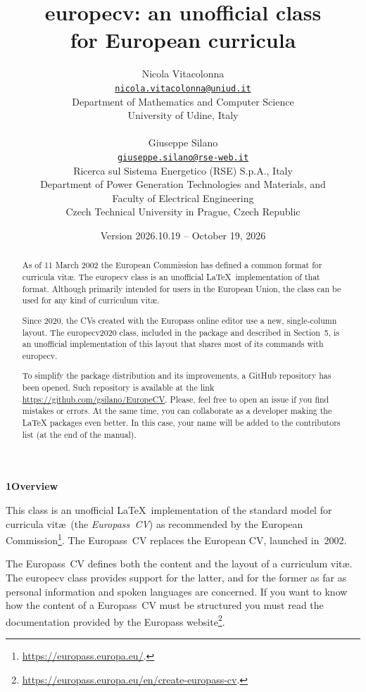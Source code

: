 \documentclass{europecv}
\title{\textsf{europecv}: an unofficial class\\
	for European curricula}
\author{Nicola Vitacolonna\\
	\href{mailto:nicola.vitacolonna@uniud.it}{\texttt{nicola.vitacolonna@uniud.it}}\\
	Department of Mathematics and Computer Science\\
	University of Udine, Italy\\
	\\
	Giuseppe Silano\\
	\href{mailto:giuseppe.silano@rse-web.it}{\texttt{giuseppe.silano@rse-web.it}}\\
    Ricerca sul Sistema Energetico (RSE) S.p.A., Italy\\ 
    Department of Power Generation Technologies and Materials, and\\
    Faculty of Electrical Engineering\\
    Czech Technical University in Prague, Czech Republic\\
}
\date{Version 2026.10.19 -- October 19, 2026}
\begin{document}

\maketitle

\pagestyle{plain}


\label{ABSTRACT}
\begin{abstract}

As of 11 March 2002 the European Commission has defined a common format for curricula vit\ae. The \textsf{europecv} class is an unofficial \LaTeX\ implementation of that format. Although primarily intended for users in the European Union, the class can be used for any kind of curriculum vit\ae.

Since 2020, the CVs created with the Europass online editor use a new, single-column layout. The \textsf{europecv2020} class, included in the package and described in Section~5, is an unofficial implementation of this layout that shares most of its commands with \textsf{europecv}.

To simplify the package distribution and its improvements, a GitHub repository has been opened.
Such repository is available at the link \url{https://github.com/gsilano/EuropeCV}. Please, feel
free to open an issue if you find mistakes or errors. At the same time, you can collaborate as a
developer making the LaTeX packages even better. In this case, your name will be added to the
contributors list (at the end of the manual).

\end{abstract}



\label{Overview}
\vspace{0.25cm}
\textbf{\large{1\hspace{0.5cm}Overview}}
\vspace{0.25cm}

This class is an unofficial \LaTeX\ implementation of the standard model for curricula vit\ae\ (the
\emph{Europass~CV\/}) as recommended by the European
Commission\footnote{\url{https://europass.europa.eu/}.}. The Europass~CV
replaces the European CV, launched in~2002.

The Europass~CV defines both the content and the layout of a curriculum vit\ae. The
\textsf{europecv} class provides support for the latter, and for the former as far as personal
information and spoken languages are concerned. If you want to know how the content of a
Europass~CV must be structured you must read the documentation provided by the Europass
website\footnote{\url{https://europass.europa.eu/en/create-europass-cv}.}.
\end{document}
